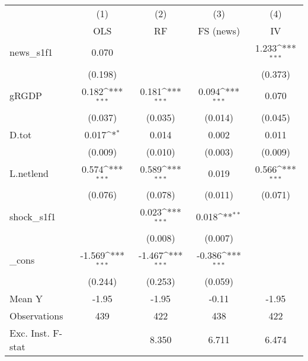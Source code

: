 {
\def\sym#1{\ifmmode^{#1}\else\(^{#1}\)\fi}
\begin{tabular}{l*{4}{c}}
\toprule
            &\multicolumn{1}{c}{(1)}&\multicolumn{1}{c}{(2)}&\multicolumn{1}{c}{(3)}&\multicolumn{1}{c}{(4)}\\
            &\multicolumn{1}{c}{OLS}&\multicolumn{1}{c}{RF}&\multicolumn{1}{c}{FS (news)}&\multicolumn{1}{c}{IV}\\
\midrule
news\_s1f1   &       0.070         &                     &                     &       1.233\sym{***}\\
            &     (0.198)         &                     &                     &     (0.373)         \\
\addlinespace
gRGDP       &       0.182\sym{***}&       0.181\sym{***}&       0.094\sym{***}&       0.070         \\
            &     (0.037)         &     (0.035)         &     (0.014)         &     (0.045)         \\
\addlinespace
D.tot       &       0.017\sym{*}  &       0.014         &       0.002         &       0.011         \\
            &     (0.009)         &     (0.010)         &     (0.003)         &     (0.009)         \\
\addlinespace
L.netlend   &       0.574\sym{***}&       0.589\sym{***}&       0.019         &       0.566\sym{***}\\
            &     (0.076)         &     (0.078)         &     (0.011)         &     (0.071)         \\
\addlinespace
shock\_s1f1  &                     &       0.023\sym{***}&       0.018\sym{**} &                     \\
            &                     &     (0.008)         &     (0.007)         &                     \\
\addlinespace
\_cons      &      -1.569\sym{***}&      -1.467\sym{***}&      -0.386\sym{***}&                     \\
            &     (0.244)         &     (0.253)         &     (0.059)         &                     \\
\midrule
Mean Y      &       -1.95         &       -1.95         &       -0.11         &       -1.95         \\
Observations&         439         &         422         &         438         &         422         \\
Exc. Inst. F-stat&                     &       8.350         &       6.711         &       6.474         \\
\bottomrule
\end{tabular}
}
